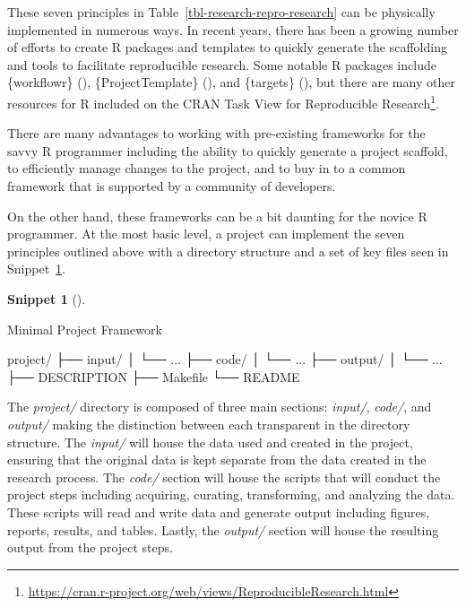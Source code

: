 \documentclass[
  letterpaper,
  krantz1]{latex/krantz-mod}
\newenvironment{Shaded}{\begin{snugshade}}{\end{snugshade}}
\newcommand{\ExtensionTok}[1]{\textcolor[rgb]{0.00,0.00,0.00}{#1}}
\newcommand{\NormalTok}[1]{\textcolor[rgb]{0.00,0.00,0.00}{#1}}
\theoremstyle{definition}
\newtheorem{definition}{Snippet}[chapter]
\theoremstyle{definition}
\theoremstyle{remark}
\DeclareRobustCommand{\href}[2]{#2\footnote{\url{#1}}}
\begin{document}
These seven principles in Table~\ref{tbl-research-repro-research} can be
physically implemented in numerous ways. In recent years, there has been
a growing number of efforts to create R packages and templates to
quickly generate the scaffolding and tools to facilitate reproducible
research. Some notable R packages include \{workflowr\}
(),
\{ProjectTemplate\} (), and
\{targets\} (), but there are many
other resources for R included on the
\href{https://cran.r-project.org/web/views/ReproducibleResearch.html}{CRAN
Task View for Reproducible
Research}.

There are many advantages to working with pre-existing frameworks for
the savvy R programmer including the ability to quickly generate a
project scaffold, to efficiently manage changes to the project, and to
buy in to a common framework that is supported by a community of
developers.

On the other hand, these frameworks can be a bit daunting for the novice
R programmer. At the most basic level, a project can implement the seven
principles outlined above with a directory structure and a set of key
files seen in Snippet~\ref{def-research-basic-project}.

\begin{definition}[]\protect\hypertarget{def-research-basic-project}{}\label{def-research-basic-project}

Minimal Project Framework

\begin{Shaded}
\begin{Highlighting}[]
\ExtensionTok{project/}
\ExtensionTok{├──}\NormalTok{ input/}
\ExtensionTok{│}\NormalTok{   └── ...}
\ExtensionTok{├──}\NormalTok{ code/}
\ExtensionTok{│}\NormalTok{   └── ...}
\ExtensionTok{├──}\NormalTok{ output/}
\ExtensionTok{│}\NormalTok{   └── ...}
\ExtensionTok{├──}\NormalTok{ DESCRIPTION}
\ExtensionTok{├──}\NormalTok{ Makefile}
\ExtensionTok{└──}\NormalTok{ README}
\end{Highlighting}
\end{Shaded}

\end{definition}

The \emph{project/} directory is composed of three main sections:
\emph{input/}, \emph{code/}, and \emph{output/} making the distinction
between each transparent in the directory structure. The \emph{input/}
will house the data used and created in the project, ensuring that the
original data is kept separate from the data created in the research
process. The \emph{code/} section will house the scripts that will
conduct the project steps including acquiring, curating, transforming,
and analyzing the data. These scripts will read and write data and
generate output including figures, reports, results, and tables. Lastly,
the \emph{output/} section will house the resulting output from the
project steps.
\end{document}
